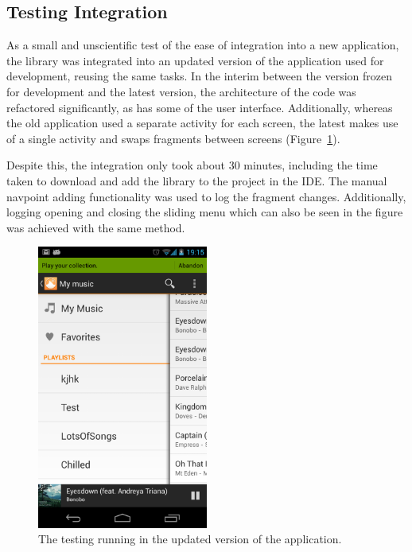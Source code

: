 \subsection{Testing Integration}

As a small and unscientific test of the ease of integration into a
new application, the library was integrated into an updated version
of the application used for development, reusing the same 
tasks. In the interim between the version
frozen for development and the latest version, the architecture of
the code was refactored significantly, as has some of the user
interface. Additionally, whereas the old application used a separate
activity for each screen, the latest makes use of a single activity
and swaps fragments between screens (Figure~\ref{fig:updated-application}). 

Despite this, the integration only took about 30 minutes, including the time taken
to download and add the library to the project in the IDE\@. The manual
navpoint adding functionality was used to log the fragment changes. Additionally,
logging opening and closing the sliding menu which can also be seen in
the figure was achieved with the same method.

\begin{figure}[h]
  \centering 
  \includegraphics[width=0.5\textwidth]{images/updated-application}
  \caption{The testing running in the updated version of the application.}
  \label{fig:updated-application}
\end{figure}

